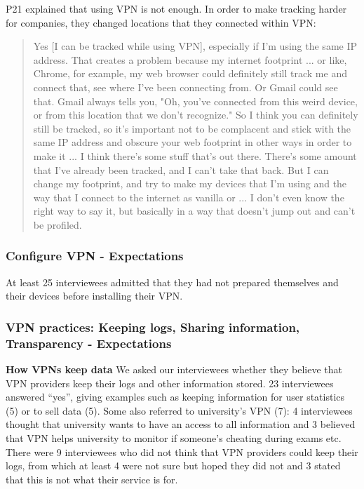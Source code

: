 P21 explained that using VPN is not enough. In order to make tracking harder
for companies, they changed locations that they connected within VPN:
\begin{quote}Yes [I can be tracked while using VPN], especially if I'm using
the same IP address. That creates a problem because my internet footprint ...
or like, Chrome, for example, my web browser could definitely still track me
and connect that, see where I've been connecting from. Or Gmail could see
that. Gmail always tells you, "Oh, you've connected from this weird device, or
from this location that we don't recognize." So I think you can definitely
still be tracked, so it's important not to be complacent and stick with the
same IP address and obscure your web footprint in other ways in order to make
it ... I think there's some stuff that's out there. There's some amount that
I've already been tracked, and I can't take that back. But I can change my
footprint, and try to make my devices that I'm using and the way that I
connect to the internet as vanilla or ... I don't even know the right way to
say it, but basically in a way that doesn't jump out and can't be
profiled.\end{quote}


\subsubsection{Configure VPN - Expectations} At least 25 interviewees admitted
that they had not prepared themselves and their devices before installing
their VPN.

\subsubsection{VPN practices: Keeping logs, Sharing information, Transparency
- Expectations} \textbf{How VPNs keep data} We asked our interviewees whether
they believe that VPN providers keep their logs and other information stored.
23 interviewees answered “yes”, giving examples such as keeping information
for user statistics (5) or to sell data (5). Some also referred to
university’s VPN (7): 4 interviewees thought that university wants to have an
access to all information and 3 believed that VPN helps university to monitor
if someone’s cheating during exams etc. There were 9 interviewees who did not
think that VPN providers could keep their logs, from which at least 4 were not
sure but hoped they did not and 3 stated that this is not what their service
is for.

